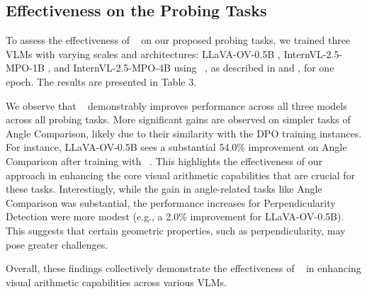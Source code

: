 \subsection{Effectiveness on the Probing Tasks}



To assess the effectiveness of \method~ on our proposed probing tasks, we trained three VLMs with varying scales and architectures: LLaVA-OV-0.5B \cite{li2024llavaov}, InternVL-2.5-MPO-1B \cite{wang2024mpo}, and InternVL-2.5-MPO-4B using \method~, as described in  and , for one epoch. The results are presented in Table 3.%

We observe that \method~ demonstrably improves performance across all three models across all probing tasks. More significant gains are observed on simpler tasks of Angle Comparison, likely due to their similarity with the DPO training instances. For instance, LLaVA-OV-0.5B sees a substantial 54.0\% improvement on Angle Comparison after training with \method~.  This highlights the effectiveness of our approach in enhancing the core visual arithmetic capabilities that are crucial for these tasks. Interestingly, while the gain in angle-related tasks like Angle Comparison was substantial, the performance increases for Perpendicularity Detection were more modest (e.g., a 2.0\% improvement for LLaVA-OV-0.5B). This suggests that certain geometric properties, such as perpendicularity, may pose greater challenges. %


Overall, these findings collectively demonstrate the effectiveness of \method~ in enhancing visual arithmetic capabilities across various VLMs.%



